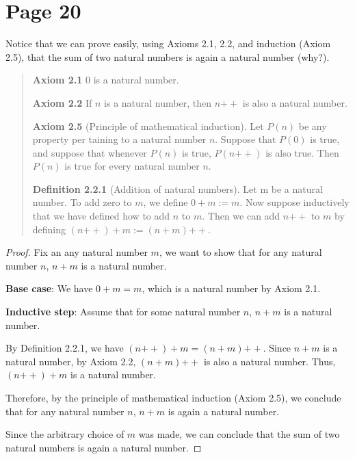 \documentclass{article}
\newcommand{\doubleplus}{\mathbin{{+}{+}}}
\begin{document}
\section{Page 20}
Notice that we can prove easily, using Axioms 2.1, 2.2, and induction (Axiom
2.5), that the sum of two natural numbers is again a natural number (why?).

\begin{quotation}

    \textbf{Axiom 2.1} $0$ is a natural number.

    \textbf{Axiom 2.2} If $n$ is a natural number, then $n\doubleplus$ is also a natural number.

    \textbf{Axiom 2.5} (Principle of mathematical induction). Let $P(n)$ be any property per
    taining to a natural number $n$. Suppose that $P(0)$ is true, and suppose that whenever
    $P(n)$ is true, $P(n\doubleplus)$ is also true. Then $P(n)$ is true for every natural number $n$.

    \textbf{Definition 2.2.1} (Addition of natural numbers). Let m be a natural number. To add
    zero to $m$, we define $0 +m := m$.
    Now suppose inductively that we have defined how to add $n$ to $m$.
    Then we can add $n\doubleplus$ to $m$ by defining $(n\doubleplus)+m := (n +m)\doubleplus$.

\end{quotation}

\begin{proof}
    Fix an any natural number $m$,
    we want to show that for any natural number $n$, $n + m$ is a natural number.

    \textbf{Base case}:  We have $0 + m = m$, which is a natural number by Axiom 2.1.

    \textbf{Inductive step}: Assume that for some natural number $n$, $n + m$ is a natural number.

    By Definition 2.2.1, we have $(n\doubleplus) + m = (n + m) \doubleplus$.
    Since $n + m$ is a natural number, by Axiom 2.2, $(n + m) \doubleplus$ is also a natural number.
    Thus, $(n\doubleplus) + m$ is a natural number.

    Therefore, by the principle of mathematical induction (Axiom 2.5),
    we conclude that for any natural number $n$, $n+m$ is again a natural number.

    Since the arbitrary choice of $m$ was made,
    we can conclude that the sum of two natural numbers is again a natural number.

\end{proof}
\end{document}
